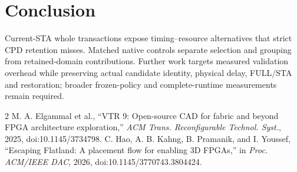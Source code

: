 \documentclass[conference,10pt]{IEEEtran}
\begin{document}
\section{Conclusion}
Current-STA whole transactions expose timing--resource alternatives that strict CPD retention misses. Matched native controls separate selection and grouping from retained-domain contributions. Further work targets measured validation overhead while preserving actual candidate identity, physical delay, FULL/STA and restoration; broader frozen-policy and complete-runtime measurements remain required.

\begin{thebibliography}{2}
 M. A. Elgammal et al., ``VTR 9: Open-source CAD for fabric and beyond FPGA architecture exploration,'' \emph{ACM Trans. Reconfigurable Technol. Syst.}, 2025, doi:10.1145/3734798.
 C. Hao, A. B. Kahng, B. Pramanik, and I. Youssef, ``Escaping Flatland: A placement flow for enabling 3D FPGAs,'' in \emph{Proc. ACM/IEEE DAC}, 2026, doi:10.1145/3770743.3804424.
\end{thebibliography}
\end{document}

